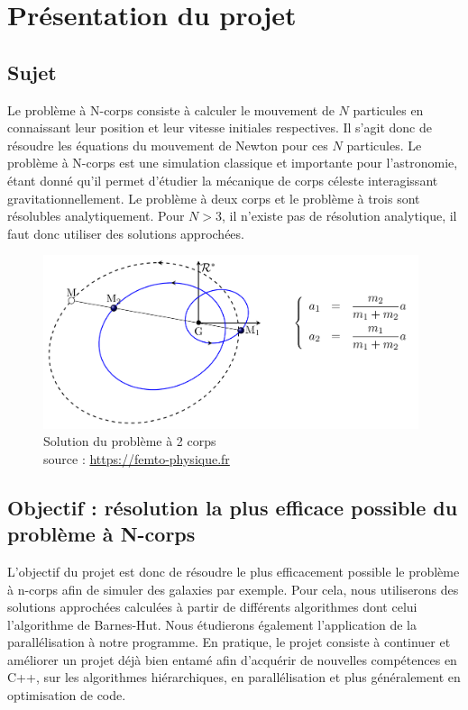 \chapter{Présentation du projet}
\section{Sujet}
Le problème à N-corps consiste à calculer le mouvement de  $N$ particules en connaissant leur position et leur vitesse initiales respectives.
Il s'agit donc de résoudre les équations du mouvement de Newton pour ces $N$ particules.
Le problème à N-corps est une simulation classique et importante pour l'astronomie, étant donné qu'il permet d'étudier la mécanique de corps céleste interagissant gravitationnellement.
Le problème à deux corps et le problème à trois sont  résolubles analytiquement. Pour $N>3$, il n'existe pas de résolution analytique, il faut donc utiliser des solutions approchées.

\begin{figure}[!h]
\begin{center}
\includegraphics[width=11cm]{presentation/2_corps.png}
\captionsetup{hypcap=false}
\caption{Solution du problème à 2 corps \\
source : \url{https://femto-physique.fr}}
\label{fig1}
\end{center}
\end{figure}

\section{Objectif : résolution la plus efficace possible du problème à N-corps}

L'objectif du projet est donc de résoudre le plus efficacement possible le problème à n-corps afin de simuler des galaxies par exemple.
Pour cela, nous utiliserons des solutions approchées calculées à partir de différents algorithmes dont celui l'algorithme de Barnes-Hut. Nous étudierons également l'application de la parallélisation à notre programme.
En pratique, le projet consiste à continuer et améliorer un projet déjà bien entamé afin d'acquérir de nouvelles compétences en C++, sur les algorithmes hiérarchiques, en parallélisation et plus généralement en optimisation de code.

